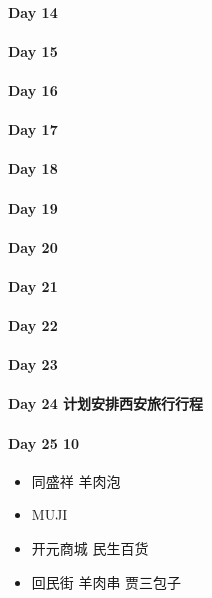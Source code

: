 \documentclass[UTF8,a4paper,8pt]{ctexart}
\begin{document}
	\paragraph{Day 14      \quad     }
	\paragraph{Day 15      \quad     }
	\paragraph{Day 16      \quad     }
	\paragraph{Day 17      \quad     }
	\paragraph{Day 18      \quad     }
	\paragraph{Day 19      \quad     }
	\paragraph{Day 20      \quad     }
	\paragraph{Day 21      \quad     }
	\paragraph{Day 22      \quad     }
	\paragraph{Day 23      \quad     }
	\paragraph{Day 24  计划安排西安旅行行程    \quad     }
	\paragraph{Day 25  10    \quad     }
		\begin{itemize}
			\item 同盛祥 羊肉泡 
			\item MUJI
			\item 开元商城 民生百货
			\item 回民街 羊肉串 贾三包子
		\end{itemize}
		
\end{document}
